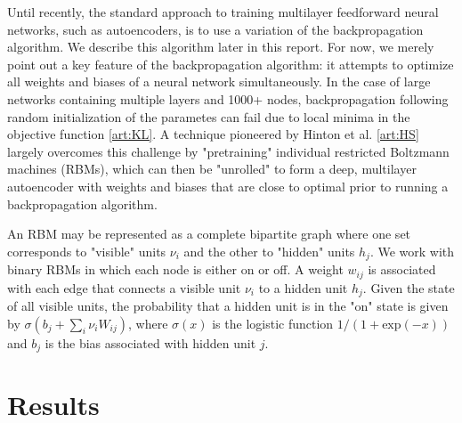 \documentclass{article}
\begin{document}
Until recently, the standard approach to training multilayer feedforward neural
networks, such as autoencoders, is to use a variation of the backpropagation
algorithm. We describe this algorithm later in this report. For now, we merely
point out a key feature of the backpropagation algorithm: it attempts to
optimize all weights and biases of a neural network simultaneously. In the case
of large networks containing multiple layers and 1000+ nodes, backpropagation
following random initialization of the parametes can fail due to local minima in
the objective function \ref{art:KL}. A technique pioneered by Hinton et al.
\ref{art:HS} largely overcomes this challenge by "pretraining" individual
restricted Boltzmann machines (RBMs), which can then be "unrolled" to form a
deep, multilayer autoencoder with weights and biases that are close to optimal
prior to running a backpropagation algorithm.

An RBM may be represented as a complete bipartite graph where one set
corresponds to "visible" units $\nu_i$ and the other to "hidden" units $h_j$. We
work with binary RBMs in which each node is either on or off. A weight $w_{ij}$
is associated with each edge that connects a visible unit $\nu_i$ to a hidden
unit $h_j$. Given the state of all visible units, the probability that a hidden
unit is in the "on" state is given by $\sigma\left(b_j +
\sum_i{\nu_iW_{ij}}\right)$, where $\sigma (x)$ is the logistic function $1/(1 +
\mathrm{exp}(-x))$ and $b_j$ is the bias associated with hidden unit $j$.

\section{Results}\label{sec:results}
\end{document}
